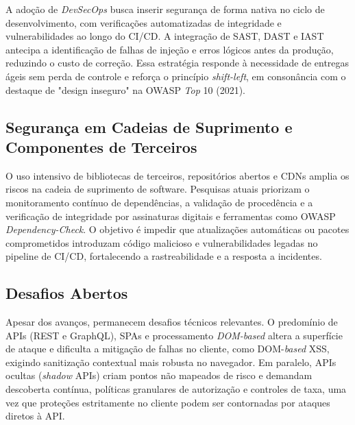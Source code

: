 A adoção de \textit{DevSecOps} busca inserir segurança de forma nativa no ciclo de desenvolvimento, com verificações automatizadas de integridade e vulnerabilidades ao longo do CI/CD. A integração de SAST, DAST e IAST antecipa a identificação de falhas de injeção e erros lógicos antes da produção, reduzindo o custo de correção. Essa estratégia responde à necessidade de entregas ágeis sem perda de controle e reforça o princípio \textit{shift-left}, em consonância com o destaque de "design inseguro" na OWASP \textit{Top} 10 (2021).

\subsection{
    Segurança em Cadeias de Suprimento e Componentes de Terceiros
}

O uso intensivo de bibliotecas de terceiros, repositórios abertos e CDNs amplia os riscos na cadeia de suprimento de software. Pesquisas atuais priorizam o monitoramento contínuo de dependências, a validação de procedência e a verificação de integridade por assinaturas digitais e ferramentas como OWASP \textit{Dependency-Check}. O objetivo é impedir que atualizações automáticas ou pacotes comprometidos introduzam código malicioso e vulnerabilidades legadas no pipeline de CI/CD, fortalecendo a rastreabilidade e a resposta a incidentes.

\subsection{
    Desafios Abertos
}

Apesar dos avanços, permanecem desafios técnicos relevantes. O predomínio de APIs (REST e GraphQL), SPAs e processamento \textit{DOM-based} altera a superfície de ataque e dificulta a mitigação de falhas no cliente, como DOM-\textit{based} XSS, exigindo sanitização contextual mais robusta no navegador. Em paralelo, APIs ocultas (\textit{shadow} APIs) criam pontos não mapeados de risco e demandam descoberta contínua, políticas granulares de autorização e controles de taxa, uma vez que proteções estritamente no cliente podem ser contornadas por ataques diretos à API.
